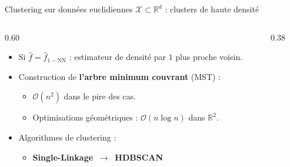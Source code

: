 \documentclass[A4,svgnames,9pt,aspectratio=169]{beamer}
\begin{document}
\begin{frame}{Clustering sur données euclidiennes $\mathcal{X} \subset \mathbb{R}^d$ : clusters de haute densité}
    \begin{columns}[c, onlytextwidth]
        \begin{column}{0.60\textwidth}
            \begin{itemize}
                \setlength{\itemsep}{12pt}
                \item Si \textbf{$\widehat{f} = \widehat{f}_{1-\text{NN}}$} : estimateur de densité par $1$ plus proche voisin.
                \item Construction de \textbf{l'arbre minimum couvrant} (MST) :
                \begin{itemize}
                    \setlength{\itemsep}{6pt}
                    \item $\mathcal{O}(n^2)$ dans le pire des cas.
                    \item Optimisations géométriques : $\mathcal{O}(n \log n)$ dans $\mathbb{R}^2$.
                \end{itemize}
                \item Algorithmes de clustering :
                \begin{itemize}
                    \item \textbf{Single-Linkage} $\ \longrightarrow\ $ \textbf{HDBSCAN}
                \end{itemize}
            \end{itemize}
        \end{column}
        
        \begin{column}{0.38\textwidth}
            \begin{center}
\end{center}
\end{column}
\end{columns}
\end{frame}
\end{document}
